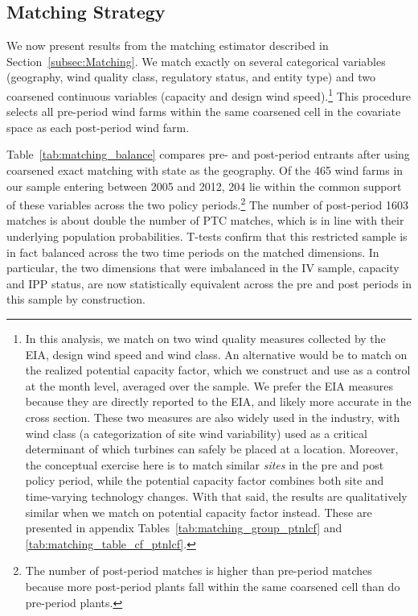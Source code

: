 \documentclass[12pt]{article}
\begin{document}
\subsection{Matching Strategy}

We now present results from the matching estimator described in Section~\ref{subsec:Matching}. We match exactly on several categorical variables (geography, wind quality class, regulatory status, and entity type) and two coarsened continuous variables (capacity and design wind speed).\footnote{In this analysis, we match on two wind quality measures collected by the EIA, design wind speed and wind class. An alternative would be to match on the realized potential capacity factor, which we construct and use as a control at the month level, averaged over the sample. We prefer the EIA measures because they are directly reported to the EIA, and likely more accurate in the cross section. These two measures are also widely used in the industry, with wind class (a categorization of site wind variability) used as a critical determinant of which turbines can safely be placed at a location. Moreover, the conceptual exercise here is to match similar \textit{sites} in the pre and post policy period, while the potential capacity factor combines both site and time-varying technology changes. With that said, the results are qualitatively similar when we match on potential capacity factor instead. These are presented in appendix Tables~\ref{tab:matching_group_ptnlcf} and \ref{tab:matching_table_cf_ptnlcf}.} This procedure selects all pre-period wind farms within the same coarsened cell in the covariate space as each post-period wind farm.

Table~\ref{tab:matching_balance} compares pre- and post-period entrants after using coarsened exact matching with state as the geography. Of the 465 wind farms in our sample entering between 2005 and 2012, 204 lie within the common support of these variables across the two policy periods.\footnote{The number of post-period matches is higher than pre-period matches because more post-period plants fall within the same coarsened cell than do pre-period plants.} The number of post-period 1603 matches is about double the number of PTC matches, which is in line with their underlying population probabilities. T-tests confirm that this restricted sample is in fact balanced across the two time periods on the matched dimensions. In particular, the two dimensions that were imbalanced in the IV sample, capacity and IPP status, are now statistically equivalent across the pre and post periods in this sample by construction. 
\end{document}
